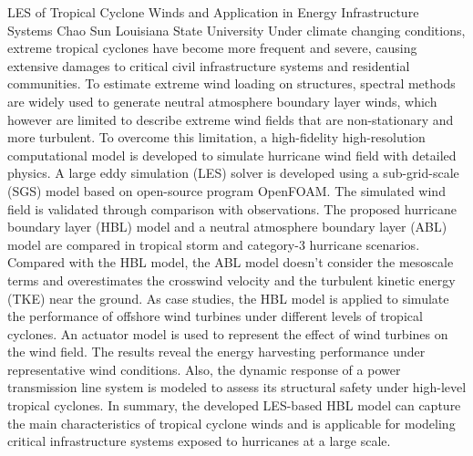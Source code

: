 \begin{addmargin}[2em]{0em}
\vspace{1.5ex}
\abs
{LES of Tropical Cyclone Winds and Application in Energy Infrastructure Systems}
{Chao Sun}
{Louisiana State University}
{Under climate changing conditions, extreme tropical cyclones have become more frequent and severe, causing extensive damages to critical civil infrastructure systems and residential communities. To estimate extreme wind loading on structures, spectral methods are widely used to generate neutral atmosphere boundary layer winds, which however are limited to describe extreme wind fields that are non-stationary and more turbulent. To overcome this limitation, a high-fidelity high-resolution computational model is developed to simulate hurricane wind field with detailed physics. A large eddy simulation (LES) solver is developed using a sub-grid-scale (SGS) model based on open-source program OpenFOAM. The simulated wind field is validated through comparison with observations. The proposed hurricane boundary layer (HBL) model and a neutral atmosphere boundary layer (ABL) model are compared in tropical storm and category-3 hurricane scenarios. Compared with the HBL model, the ABL model doesn’t consider the mesoscale terms and overestimates the crosswind velocity and the turbulent kinetic energy (TKE) near the ground. As case studies, the HBL model is applied to simulate the performance of offshore wind turbines under different levels of tropical cyclones. An actuator model is used to represent the effect of wind turbines on the wind field. The results reveal the energy harvesting performance under representative wind conditions. Also, the dynamic response of a power transmission line system is modeled to assess its structural safety under high-level tropical cyclones. In summary, the developed LES-based HBL model can capture the main characteristics of tropical cyclone winds and is applicable for modeling critical infrastructure systems exposed to hurricanes at a large scale.}



\end{addmargin}
